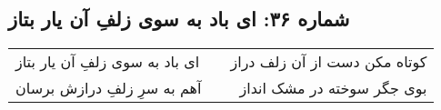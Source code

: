 \begin{center}
\section*{شماره ۳۶: ای باد به سوی زلفِ آن یار بتاز}
\label{sec:036}
\begin{longtable}{l p{0.5cm} r}
ای باد به سوی زلفِ آن یار بتاز
&&
کوتاه مکن دست از آن زلف دراز
\\
آهم به سرِ زلفِ درازش برسان
&&
بوی جگر سوخته در مشک انداز
\\
\end{longtable}
\end{center}
